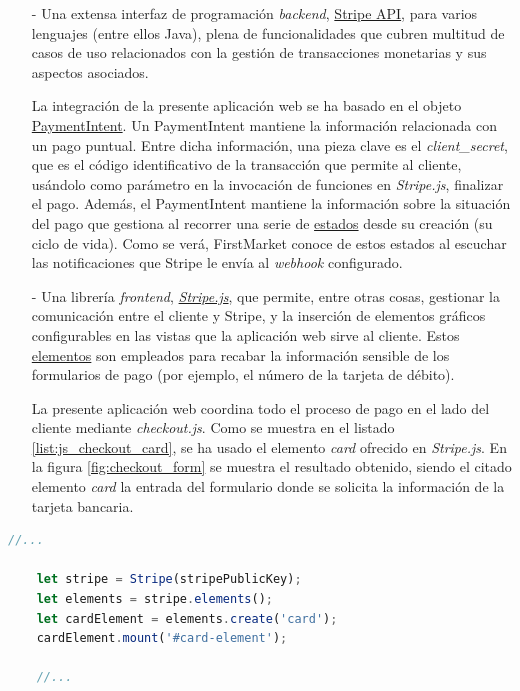 \documentclass[a4paper,12pt,twoside,openright]{report}
\begin{document}
    \begin{itemize}
    	\item[-] Una extensa interfaz de programación \emph{backend}, \href{https://stripe.com/docs/api}{Stripe API}, para varios lenguajes (entre ellos Java), plena de funcionalidades que cubren multitud de casos de uso relacionados con la gestión de transacciones monetarias y sus aspectos asociados.
    	
    	La integración de la presente aplicación web se ha basado en el objeto \href{https://stripe.com/docs/api/payment_intents}{PaymentIntent}. Un PaymentIntent mantiene la información relacionada con un pago puntual. Entre dicha información, una pieza clave es el \emph{client\_secret}, que es el código identificativo de la transacción que permite al cliente, usándolo como parámetro en la invocación de funciones en \emph{Stripe.js}, finalizar el pago. Además, el PaymentIntent mantiene la información sobre la situación del pago que gestiona al recorrer una serie de \href{https://stripe.com/docs/payments/intents#intent-statuses}{estados} desde su creación (su ciclo de vida). Como se verá, FirstMarket conoce de estos estados al escuchar las notificaciones que Stripe le envía al \emph{webhook} configurado.
    	
    	\item[-] Una librería \emph{frontend}, \href{https://stripe.com/docs/js}{\emph{Stripe.js}}, que permite, entre otras cosas, gestionar la comunicación entre el cliente y Stripe, y la inserción de elementos gráficos configurables en las vistas que la aplicación web sirve al cliente. Estos \href{https://stripe.com/docs/js/elements_object}{elementos} son empleados para recabar la información sensible de los formularios de pago (por ejemplo, el número de la tarjeta de débito).
    	
    	La presente aplicación web coordina todo el proceso de pago en el lado del cliente mediante \emph{checkout.js}. Como se muestra en el listado \ref{list:js_checkout_card}, se ha usado el elemento \emph{card} ofrecido en \emph{Stripe.js}. En la figura \ref{fig:checkout_form} se muestra el resultado obtenido, siendo el citado elemento \emph{card} la entrada del formulario donde se solicita la información de la tarjeta bancaria.
    \end{itemize}
    
    \begin{lstlisting}[language=Javascript,caption=Extracto de checkout.js donde se crea y enlaza el elemento \emph{card},label=list:js_checkout_card]
    //...
    
    let stripe = Stripe(stripePublicKey);
    let elements = stripe.elements();
    let cardElement = elements.create('card');
    cardElement.mount('#card-element');
    
    //...
    \end{lstlisting}
    
\end{document}
